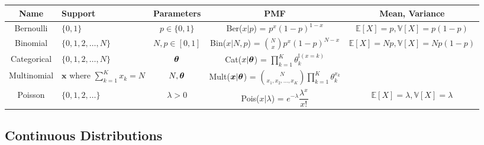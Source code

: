 \documentclass{report}
\begin{document}
\begin{center}
\begin{tabularx}{\textwidth}{c X c c c}
    \toprule
    \textbf{Name} & \textbf{Support} & \textbf{Parameters} & \textbf{PMF} & \textbf{Mean, Variance} \\
    \midrule
    Bernoulli & \(\{0, 1\}\) & \(p \in \{0, 1\}\) & Ber(\(x|p\)) = \(p^x (1-p)^{1-x}\) & \(\mathbb{E}[X] = p, \mathbb{V}[X] = p(1-p)\) \\
    \midrule
    Binomial & \(\{0, 1, 2, \ldots, N\}\) & \(N, p \in [0,1]\) & Bin(\(x|N,p\)) = \(\binom{N}{x} p^x (1-p)^{N-x}\) & \(\mathbb{E}[X] = Np, \mathbb{V}[X] = Np(1-p)\) \\
    \midrule
    Categorical & \(\{0, 1, 2, \ldots, N\}\) & \(\boldsymbol{\theta}\) & Cat(\(x|\boldsymbol{\theta}\)) = \(\prod_{k=1}^{K}\theta_{k}^{\mathbb{I}(x=k)}\) \\
    \midrule
    Multinomial & \(\bm{x}\) where \(\sum_{k = 1}^{K} x_k = N\) & \(N, \boldsymbol{\theta}\) & Mult(\(\bm{x}|\boldsymbol{\theta}\)) = \(\binom{N}{x_1, x_2, \ldots, x_K}\prod_{k = 1}^{K}\theta_{k}^{x_k}\) \\
    \midrule
    Poisson & \(\{0, 1, 2, \ldots\}\) & \(\lambda > 0\) & Pois(\(x|\lambda\)) = \(e^{-\lambda}\dfrac{\lambda^x}{x!}\) & \(\mathbb{E}[X] = \lambda, \mathbb{V}[X] = \lambda\) \\
    \bottomrule
\end{tabularx}
\end{center}


\subsection{Continuous Distributions}
\end{document}
